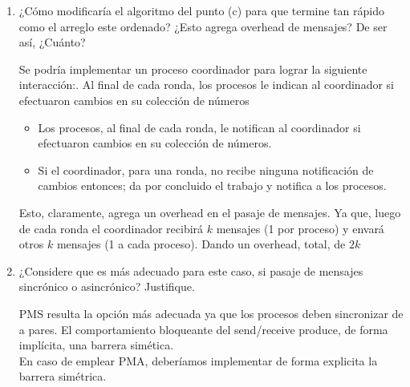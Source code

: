 \documentclass[a4paper, 10pt]{article}
\newenvironment{QandA}{
    \begin{enumerate}\bfseries}
    {\end{enumerate}
}
\newenvironment{answered}{\par\normalfont}{}
\begin{document}
\begin{QandA}
\begin{enumerate}[labelindent=0pt, align=left, leftmargin=0pt]
\item ¿Cómo modificaría el algoritmo del punto (c) para que termine tan rápido como el arreglo este ordenado? ¿Esto agrega overhead de mensajes? De ser así, ¿Cuánto?
\begin{answered}
Se podría implementar un proceso coordinador para lograr la siguiente interacción:. Al final de cada ronda, los procesos le indican al coordinador si efectuaron cambios en su colección de números
\begin{itemize}
    \item Los procesos, al final de cada ronda, le notifican al coordinador si efectuaron cambios en su colección de números.
    \item Si el coordinador, para una ronda, no recibe ninguna notificación de cambios entonces; da por concluido el trabajo y notifica a los procesos.
\end{itemize}
Esto, claramente, agrega un overhead en el pasaje de mensajes. Ya que, luego de cada ronda el coordinador recibirá $k$ mensajes (1 por proceso) y envará otros $k$ mensajes (1 a cada proceso). Dando un overhead, total, de $2k$
\end{answered}
\item ¿Considere que es más adecuado para este caso, si pasaje de mensajes sincrónico o asincrónico? Justifique.
\begin{answered}
PMS resulta la opción más adecuada ya que los procesos deben sincronizar de a pares. El comportamiento bloqueante del send/receive produce, de forma implícita, una barrera simética.
\\
En caso de emplear PMA, deberíamos implementar de forma explicita la barrera simétrica.
\end{answered}
\end{enumerate}


\end{QandA}
\end{document}
